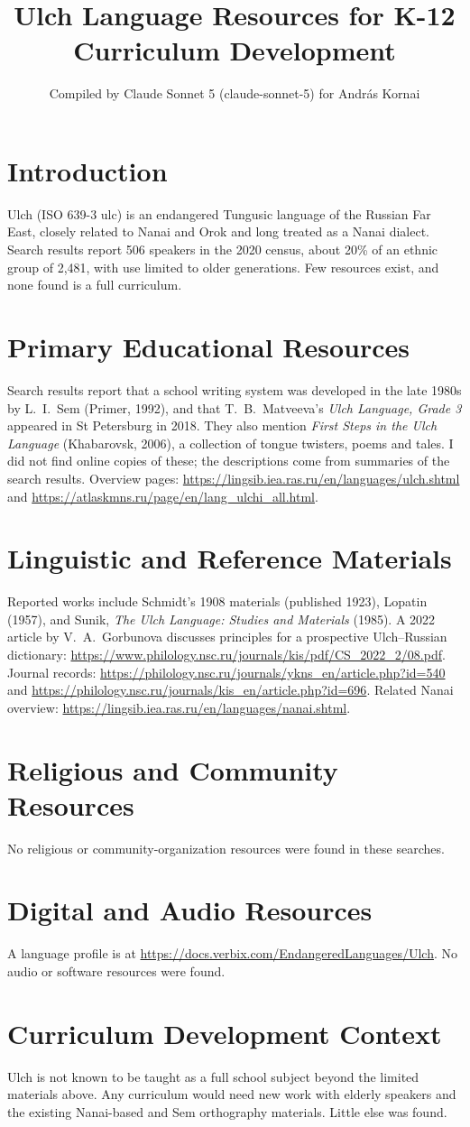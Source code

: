 \documentclass[12pt]{article}
\title{Ulch Language Resources for K-12 Curriculum Development}
\author{Compiled by Claude Sonnet 5 (claude-sonnet-5) for Andr\'as Kornai}
\date{}
\begin{document}
\maketitle
\section{Introduction}
Ulch (ISO 639-3 ulc) is an endangered Tungusic language of the Russian Far East, closely related to Nanai and Orok and long treated as a Nanai dialect. Search results report 506 speakers in the 2020 census, about 20\% of an ethnic group of 2,481, with use limited to older generations. Few resources exist, and none found is a full curriculum.
\section{Primary Educational Resources}
Search results report that a school writing system was developed in the late 1980s by L.~I.~Sem (Primer, 1992), and that T.~B.~Matveeva's \emph{Ulch Language, Grade 3} appeared in St Petersburg in 2018. They also mention \emph{First Steps in the Ulch Language} (Khabarovsk, 2006), a collection of tongue twisters, poems and tales. I did not find online copies of these; the descriptions come from summaries of the search results. Overview pages: \url{https://lingsib.iea.ras.ru/en/languages/ulch.shtml} and \url{https://atlaskmns.ru/page/en/lang_ulchi_all.html}.
\section{Linguistic and Reference Materials}
Reported works include Schmidt's 1908 materials (published 1923), Lopatin (1957), and Sunik, \emph{The Ulch Language: Studies and Materials} (1985). A 2022 article by V.~A.~Gorbunova discusses principles for a prospective Ulch--Russian dictionary: \url{https://www.philology.nsc.ru/journals/kis/pdf/CS_2022_2/08.pdf}. Journal records: \url{https://philology.nsc.ru/journals/ykns_en/article.php?id=540} and \url{https://philology.nsc.ru/journals/kis_en/article.php?id=696}. Related Nanai overview: \url{https://lingsib.iea.ras.ru/en/languages/nanai.shtml}.
\section{Religious and Community Resources}
No religious or community-organization resources were found in these searches.
\section{Digital and Audio Resources}
A language profile is at \url{https://docs.verbix.com/EndangeredLanguages/Ulch}. No audio or software resources were found.
\section{Curriculum Development Context}
Ulch is not known to be taught as a full school subject beyond the limited materials above. Any curriculum would need new work with elderly speakers and the existing Nanai-based and Sem orthography materials. Little else was found.
\end{document}
